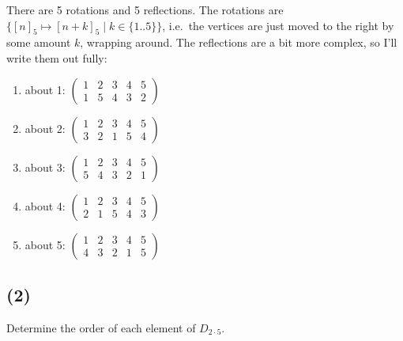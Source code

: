 \documentclass[fleqn]{article}
\begin{document}
            There are 5 rotations and 5 reflections.  The rotations are $\{[n]_5 \mapsto [n + k]_5 \mid k \in \{1..5\}\}$, i.e.\ the vertices are just moved to the right by some amount $k$, wrapping around.  The reflections are a bit more complex, so I'll write them out fully:
            \begin{enumerate}
                
                \item 
                about 1: $\begin{pmatrix}
                    1 & 2 & 3 & 4 & 5 \\
                    1 & 5 & 4 & 3 & 2
                \end{pmatrix}$
                
                \item 
                about 2: $\begin{pmatrix}
                    1 & 2 & 3 & 4 & 5 \\
                    3 & 2 & 1 & 5 & 4
                \end{pmatrix}$
                
                \item 
                about 3: $\begin{pmatrix}
                    1 & 2 & 3 & 4 & 5 \\
                    5 & 4 & 3 & 2 & 1
                \end{pmatrix}$
                
                \item 
                about 4: $\begin{pmatrix}
                    1 & 2 & 3 & 4 & 5 \\
                    2 & 1 & 5 & 4 & 3
                \end{pmatrix}$
                
                \item 
                about 5: $\begin{pmatrix}
                    1 & 2 & 3 & 4 & 5 \\
                    4 & 3 & 2 & 1 & 5
                \end{pmatrix}$
                
            \end{enumerate}
        
        \subsection{(2)}
        Determine the order of each element of $D_{2 \cdot 5}$.
            
\end{document}
